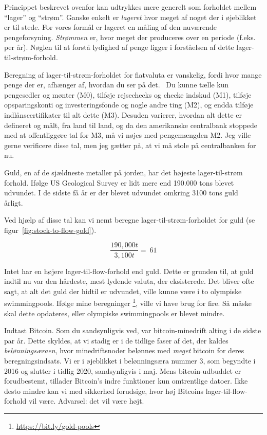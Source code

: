 Princippet beskrevet ovenfor kan udtrykkes mere generelt som
forholdet mellem \enquote{lager} og \enquote{strøm}. Ganske enkelt er 
\textit{lageret} hvor meget af noget der i øjeblikket er til stede. For vores 
formål er lageret en måling af den nuværende pengeforsyning. \textit{Strømmen} 
er, hvor meget der produceres over en periode (f.eks. per år). Nøglen til at 
forstå lydighed af penge ligger i forståelsen af dette lager-til-strøm-forhold.

Beregning af lager-til-strøm-forholdet for fiatvaluta er vanskelig, fordi hvor
mange penge der er, afhænger af, hvordan du ser på det.~\cite{wiki:money-supply} 
Du kunne tælle kun pengesedler og mønter (M0), tilføje rejsechecks og checke
indskud (M1), tilføje opsparingskonti og investeringsfonde og nogle andre ting 
(M2), og endda tilføje indlånscertifikater til alt dette (M3). Desuden 
varierer, hvordan alt dette er defineret og målt, fra land til land, og da den 
amerikanske centralbank stoppede med at offentliggøre \cite{web:fed-m3} tal 
for M3, må vi nøjes med pengemængden M2. Jeg ville gerne verificere disse
tal, men jeg gætter på, at vi må stole på centralbanken for nu.

Guld, en af de sjældneste metaller på jorden, har det højeste lager-til-strøm
forhold. Ifølge US Geological Survey er lidt mere end 190.000 tons blevet 
udvundet. I de sidste få år er der blevet udvundet omkring 3100 tons guld
årligt.~\cite{mineral-commodity-summaries}

Ved hjælp af disse tal kan vi nemt beregne lager-til-strøm-forholdet for
guld (se figur~\ref{fig:stock-to-flow-gold}).

\begin{center}
  \centering
  \begin{equation}
  \frac{190,000 t}{3,100 t} = ~ 61
  \end{equation}
  \label{fig:stock-to-flow-gold}
\end{center}

Intet har en højere lager-til-flow-forhold end guld. Dette er grunden til, at 
guld indtil nu var den hårdeste, mest lydende valuta, der eksisterede. Det 
bliver ofte sagt, at alt det guld der hidtil er udvundet, ville kunne være i 
to olympiske swimmingpools. Ifølge mine beregninger
\footnote{\url{https://bit.ly/gold-pools}}, ville vi have brug for fire. Så
måske skal dette opdateres, eller olympiske swimmingpools er blevet mindre.

Indtast Bitcoin. Som du sandsynligvis ved, var bitcoin-minedrift alting i
de sidste par år. Dette skyldes, at vi stadig er i de tidlige
faser af det, der kaldes \textit{belønningsæraen}, hvor minedriftsnoder
belønnes med \textit{meget} bitcoin for deres beregningsindsats. Vi er
i øjeblikket i belønningsæra nummer 3, som begyndte i 2016 og slutter i
tidlig 2020, sandsynligvis i maj. Mens bitcoin-udbuddet er forudbestemt,
tillader Bitcoin's indre funktioner kun omtrentlige datoer.
Ikke desto mindre kan vi med sikkerhed forudsige, hvor høj Bitcoins
lager-til-flow-forhold vil være. Advarsel: det vil være højt.

